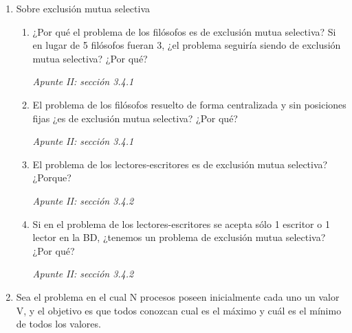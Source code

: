 \documentclass[a4paper, 10pt]{article}
\newenvironment{QandA}{
    \begin{enumerate}\bfseries}
    {\end{enumerate}
}
\newenvironment{answered}{\par\normalfont}{}
\begin{document}
\begin{QandA}
\begin{answered}
Con pasaje de mensajes sincrónicos (PMS), los canales son punto a punto. Por este motivo, solo podemos llevar a cabo la implementación ``un canal por proceso'' planteada en PMA. Aunque, en este caso, resulte aún más ineficiente ya que \lstinline{send} demora.

\end{answered}


\item Sobre exclusión mutua selectiva

\begin{enumerate}[label=\alph*)]
\item ¿Por qué el problema de los filósofos es de exclusión mutua selectiva? Si en lugar de 5 filósofos fueran 3, ¿el problema seguiría siendo de exclusión mutua selectiva? ¿Por qué?
\begin{answered}
    \emph{Apunte II: sección 3.4.1}
\end{answered}
\item El problema de los filósofos resuelto de forma centralizada y sin posiciones fijas ¿es de exclusión mutua selectiva? ¿Por qué?
\begin{answered}
    \emph{Apunte II: sección 3.4.1}
\end{answered}
\item El problema de los lectores-escritores es de exclusión mutua selectiva? ¿Porque?
\begin{answered}
    \emph{Apunte II: sección 3.4.2}
\end{answered}
\item Si en el problema de los lectores-escritores se acepta sólo 1 escritor  o 1 lector en la BD, ¿tenemos un problema de exclusión mutua selectiva?  ¿Por qué?
\begin{answered}
    \emph{Apunte II: sección 3.4.2}
\end{answered}
\end{enumerate}


\item Sea el problema en el cual N procesos poseen inicialmente cada uno un valor V, y el objetivo es que todos conozcan cual es el máximo y cuál es el mínimo de todos los valores.


\end{QandA}
\end{document}
